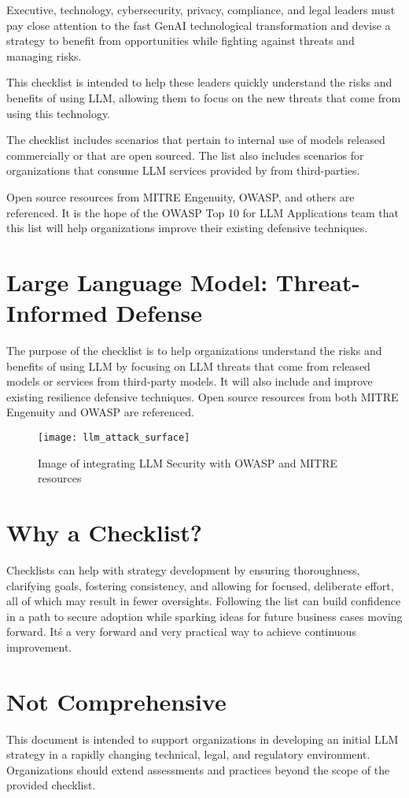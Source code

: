 Executive, technology, cybersecurity, privacy, compliance, and legal leaders
must pay close attention to the fast GenAI technological transformation and
devise a strategy to benefit from opportunities while fighting against threats
and managing risks.

This checklist is intended to help these leaders quickly understand the risks
and benefits of using LLM, allowing them to focus on the new threats that come
from using this technology.

The checklist includes scenarios that pertain to internal use of models released
commercially or that are open sourced. The list also includes scenarios for
organizations that consume LLM services provided by from third-parties.

Open source resources from MITRE Engenuity, OWASP, and others are referenced.
It is the hope of the OWASP Top 10 for LLM Applications team that this list will
help organizations improve their existing defensive techniques.


\section{Large Language Model: Threat-Informed Defense}

The purpose of the checklist is to help organizations understand the risks and
benefits of using LLM by focusing on LLM threats that come from released models
or services from third-party models. It will also include and improve existing
resilience defensive techniques. Open source resources from both MITRE Engenuity
and OWASP are referenced.

\clearpage

\begin{figure}[h]
  \centering
  \texttt{[image: llm\_attack\_surface]}
  \caption{Image of integrating LLM Security with OWASP and MITRE resources}
  \label{fig:llm-attack-surface}
\end{figure}

\section{Why a Checklist?}

Checklists can help with strategy development by ensuring thoroughness,
clarifying goals, fostering consistency, and allowing for focused, deliberate
effort, all of which may result in fewer oversights. Following the list can
build confidence in a path to secure adoption while sparking ideas for future
business cases moving forward. It\'s a very forward and very practical way to
achieve continuous improvement.

\section{Not Comprehensive}

This document is intended to support organizations in developing an initial LLM
strategy in a rapidly changing technical, legal, and regulatory environment.
Organizations should extend assessments and practices beyond the scope of the
provided checklist.
